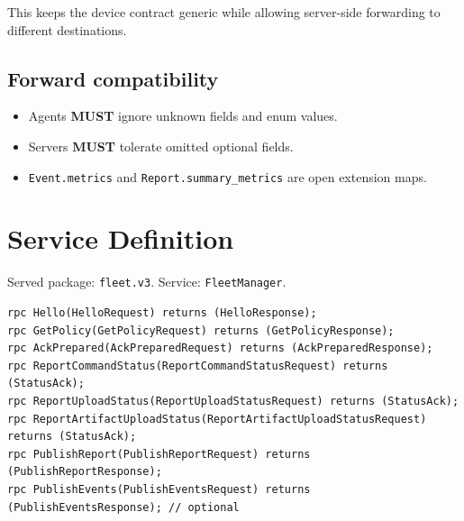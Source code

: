 \documentclass[11pt,a4paper]{article}
\begin{document}
This keeps the device contract generic while allowing server-side forwarding to different destinations.

\subsection{Forward compatibility}
\begin{itemize}
  \item Agents \textbf{MUST} ignore unknown fields and enum values.
  \item Servers \textbf{MUST} tolerate omitted optional fields.
  \item \texttt{Event.metrics} and \texttt{Report.summary\_metrics} are open extension maps.
\end{itemize}

\section{Service Definition}
Served package: \texttt{fleet.v3}. Service: \texttt{FleetManager}.

\begin{verbatim}
rpc Hello(HelloRequest) returns (HelloResponse);
rpc GetPolicy(GetPolicyRequest) returns (GetPolicyResponse);
rpc AckPrepared(AckPreparedRequest) returns (AckPreparedResponse);
rpc ReportCommandStatus(ReportCommandStatusRequest) returns (StatusAck);
rpc ReportUploadStatus(ReportUploadStatusRequest) returns (StatusAck);
rpc ReportArtifactUploadStatus(ReportArtifactUploadStatusRequest) returns (StatusAck);
rpc PublishReport(PublishReportRequest) returns (PublishReportResponse);
rpc PublishEvents(PublishEventsRequest) returns (PublishEventsResponse); // optional
\end{verbatim}
\end{document}
